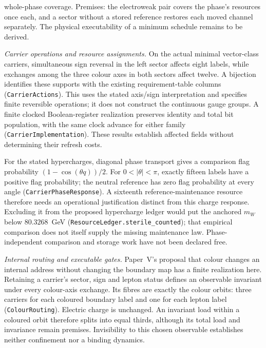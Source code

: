 whole-phase coverage. Premises: the electroweak pair covers the phase's resources once each, and a sector without a stored reference restores each moved channel separately. The physical executability of a minimum schedule remains to be derived.

\textit{Carrier operations and resource assignments.} On the actual minimal vector-class carriers, simultaneous sign reversal in the left sector affects eight labels, while exchanges among the three colour axes in both sectors affect twelve. A bijection identifies these supports with the existing requirement-table columns (\texttt{CarrierActions}). This uses the stated axis/sign interpretation and specifies finite reversible operations; it does not construct the continuous gauge groups. A finite clocked Boolean-register realization preserves identity and total bit population, with the same clock advance for either family (\texttt{CarrierImplementation}). These results establish affected fields without determining their refresh costs.

For the stated hypercharges, diagonal phase transport gives a comparison flag probability $(1-\cos(\theta q))/2$. For $0<|\theta|<\pi$, exactly fifteen labels have a positive flag probability; the neutral reference has zero flag probability at every angle (\texttt{CarrierPhaseResponse}). A sixteenth reference-maintenance resource therefore needs an operational justification distinct from this charge response. Excluding it from the proposed hypercharge ledger would put the anchored $m_W$ below $80.3268$~GeV (\texttt{ResourceLedger.sterile\_counted}); that empirical comparison does not itself supply the missing maintenance law. Phase-independent comparison and storage work have not been declared free.

\textit{Internal routing and executable gates.} Paper~V's proposal that colour changes an internal address without changing the boundary map has a finite realization here. Retaining a carrier's sector, sign and lepton status defines an observable invariant under every colour-axis exchange. Its fibres are exactly the colour orbits: three carriers for each coloured boundary label and one for each lepton label (\texttt{ColourRouting}). Electric charge is unchanged. An invariant load within a coloured orbit therefore splits into equal thirds, although its total load and invariance remain premises. Invisibility to this chosen observable establishes neither confinement nor a binding dynamics.

